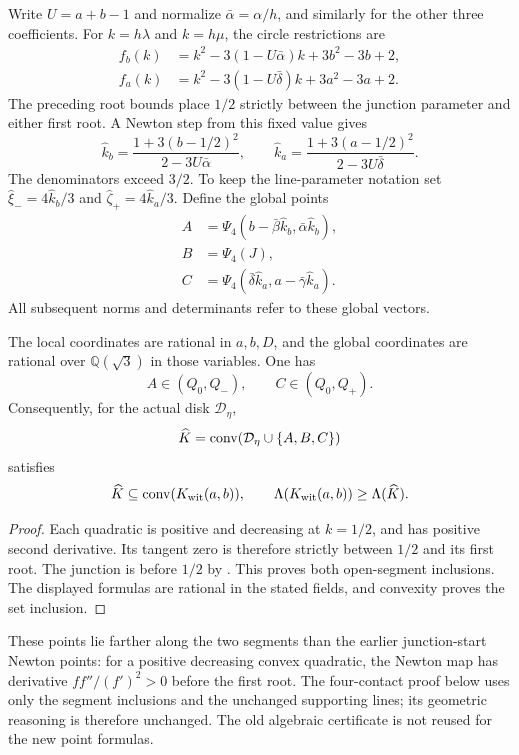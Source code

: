 Write $U=a+b-1$ and normalize
$\bar\alpha=\alpha/h$, and similarly for the other three coefficients.
For $k=h\lambda$ and $k=h\mu$, the circle restrictions are
\[
 \begin{aligned}
 f_b(k)&=k^2-3(1-U\bar\alpha)k+3b^2-3b+2,\\
 f_a(k)&=k^2-3(1-U\bar\delta)k+3a^2-3a+2.
 \end{aligned}
\]
The preceding root bounds place $1/2$ strictly between the junction
parameter and either first root.  A Newton step from this fixed value gives
\[
 \widehat k_b=\frac{1+3(b-1/2)^2}{2-3U\bar\alpha},\qquad
 \widehat k_a=\frac{1+3(a-1/2)^2}{2-3U\bar\delta}.
\]
The denominators exceed $3/2$.  To keep the line-parameter notation set
$\widehat\xi_-=4\widehat k_b/3$ and
$\widehat\zeta_+=4\widehat k_a/3$.  Define the global points
\[
 \begin{aligned}
 A&=\Psi_4(b-\bar\beta\widehat k_b,
                     \bar\alpha\widehat k_b),\\
 B&=\Psi_4(J),\\
 C&=\Psi_4(\bar\delta\widehat k_a,
                     a-\bar\gamma\widehat k_a).
 \end{aligned}
\]
All subsequent norms and determinants refer to these global vectors.

\begin{lemma}
\label{lem:technical-newton-reduction}
The local coordinates are rational in $a,b,D$, and the global coordinates
are rational over $\mathbb Q(\sqrt3)$ in those variables.  One has
\[
 A\in(Q_0,Q_-),\qquad C\in(Q_0,Q_+).
\]
Consequently, for the actual disk $\mathcal D_\eta$,
\[
 \widehat K=\mathrm{conv}(\mathcal D_\eta\cup\{A,B,C\})
\]
satisfies
\begin{equation}
 \widehat K\subseteq\mathrm{conv}(K_{\rm wit}(a,b)),\qquad
 \Lambda(K_{\rm wit}(a,b))\ge\Lambda(\widehat K).
 \label{eq:reader-newton-reduction}
\end{equation}
\end{lemma}
\begin{proof}
Each quadratic is positive and decreasing at $k=1/2$, and has positive
second derivative. Its tangent zero is therefore strictly between
$1/2$ and its first root.  The junction is before $1/2$ by
.  This proves both open-segment inclusions.
The displayed formulas are rational in the stated fields, and convexity
proves the set inclusion.
\end{proof}

These points lie farther along the two segments than the earlier
junction-start Newton points: for a positive decreasing convex quadratic,
the Newton map has derivative $ff''/(f')^2>0$ before the first root.
The four-contact proof below uses only the segment inclusions and the
unchanged supporting lines; its geometric reasoning is therefore unchanged.
The old algebraic certificate is not reused for the new point formulas.


